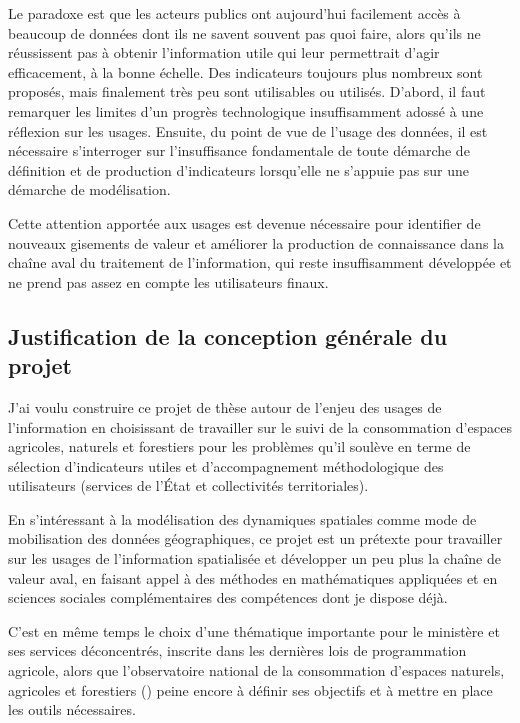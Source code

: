 Le paradoxe est que les acteurs publics ont aujourd'hui facilement accès à
beaucoup de données dont ils ne savent souvent pas quoi faire, alors qu'ils ne
réussissent pas à obtenir l'information utile qui leur permettrait d'agir
efficacement, à la bonne échelle. Des indicateurs toujours plus nombreux
sont proposés, mais finalement très peu sont utilisables ou utilisés.
D'abord, il faut remarquer les limites d'un progrès
technologique insuffisamment adossé à une réflexion sur les usages.
Ensuite, du point de vue de l'usage des données,
il est nécessaire s'interroger sur l'insuffisance fondamentale
de toute démarche de définition et de production
d'indicateurs lorsqu'elle ne s'appuie pas sur une démarche
de modélisation.

Cette attention apportée aux usages est devenue nécessaire pour identifier de
nouveaux gisements de valeur et améliorer la production de connaissance
dans la chaîne aval du traitement de l'information, qui reste
insuffisamment développée et ne prend pas assez en compte les utilisateurs
finaux.


\subsection
{Justification de la conception générale du projet}

J'ai voulu construire ce projet de thèse autour de
l'enjeu des usages de l'information en choisissant de
travailler sur le suivi de la consommation d'espaces agricoles,
naturels et forestiers pour les problèmes qu'il soulève en terme
de sélection d'indicateurs utiles et d'accompagnement méthodologique des utilisateurs
(services de l'État et collectivités territoriales).

En s'intéressant à la modélisation des dynamiques spatiales comme mode de
mobilisation des données géographiques, ce projet est un prétexte pour
travailler sur les usages de l'information spatialisée et développer un peu
plus la chaîne de valeur aval, en faisant appel à des méthodes en
mathématiques appliquées et en sciences sociales complémentaires des
compétences dont je dispose déjà.

C'est en même temps le choix d'une thématique importante pour le ministère et
ses services déconcentrés, inscrite dans les dernières lois de programmation
agricole, alors que l'observatoire national de la consommation d'espaces
naturels, agricoles et forestiers ({\OENAF}) peine encore à définir ses
objectifs et à mettre en place les outils nécessaires.
